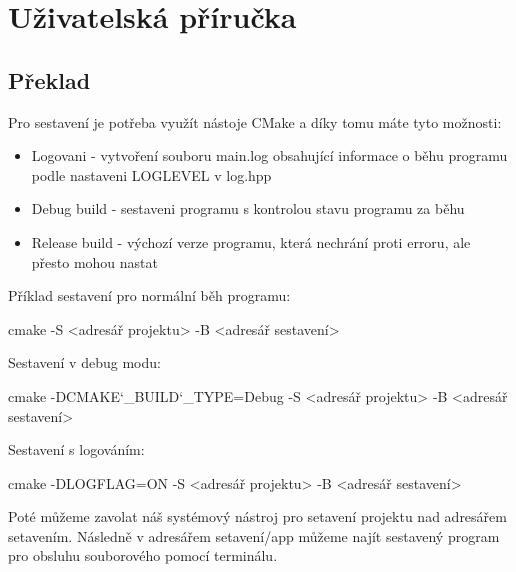 \documentclass[12pt, a4paper]{report}
\begin{document}
\chapter{Uživatelská příručka}
\section{Překlad}
Pro sestavení je potřeba využít nástoje CMake a díky tomu máte tyto možnosti:
\begin{itemize}
 \item Logovani - vytvoření souboru main.log obsahující informace o běhu programu podle nastaveni \ttfamily LOGLEVEL \normalfont v \ttfamily log.hpp \normalfont
 \item Debug build - sestaveni programu s kontrolou stavu programu za běhu
 \item Release build - výchozí verze programu, která nechrání proti erroru, ale přesto mohou nastat
\end{itemize}
Příklad sestavení pro normální běh programu:

\ttfamily cmake -S <adresář projektu> -B <adresář sestavení>

\normalfont
\noindent Sestavení v debug modu:

\ttfamily cmake -DCMAKE\char`_BUILD\char`_TYPE=Debug -S <adresář projektu> -B <adresář sestavení>

\normalfont
\noindent Sestavení s logováním:

\ttfamily cmake -DLOGFLAG=ON -S <adresář projektu> -B <adresář sestavení>

\normalfont
\noindent
Poté můžeme zavolat náš systémový nástroj pro setavení projektu nad adresářem setavením.
Následně v \ttfamily adresářem setavení/app \normalfont můžeme najít sestavený program pro obsluhu souborového pomocí terminálu.
\end{document}
